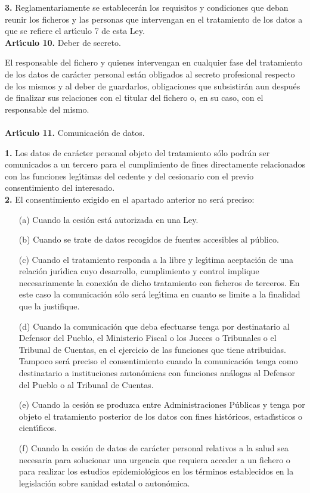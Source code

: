 {\bf 3.} Reglamentariamente se establecer\'an los requisitos y condiciones que 
deban reunir los ficheros y las personas que intervengan en el tratamiento de 
los datos a que se refiere el art\'{\i}culo 7 de esta Ley.
\vspace{0.3cm}\\
{\large {\bf Art\'{\i}culo 10.} Deber de secreto.}

El responsable del fichero y quienes intervengan en cualquier fase del 
tratamiento de los datos de car\'acter personal est\'an obligados al secreto 
profesional respecto de los mismos y al deber de guardarlos, obligaciones que 
subsistir\'an aun despu\'es de finalizar sus relaciones con el titular del 
fichero o, en su caso, con el responsable del mismo.\\
\vspace{0.3cm}\\
{\large {\bf Art\'{\i}culo 11.} Comunicaci\'on de datos.}

{\bf 1.} Los datos de car\'acter personal objeto del tratamiento s\'olo 
podr\'an ser comunicados a un tercero para el cumplimiento de fines 
directamente relacionados con las funciones leg\'{\i}timas del cedente y del 
cesionario con el previo consentimiento del interesado.\\

{\bf 2.} El consentimiento exigido en el apartado anterior no ser\'a preciso:
\begin{itemize}
\item [(a)] Cuando la cesi\'on est\'a autorizada en una Ley.
\item [(b)] Cuando se trate de datos recogidos de fuentes accesibles al 
p\'ublico.
\item [(c)] Cuando el tratamiento responda a la libre y leg\'{\i}tima 
aceptaci\'on de una relaci\'on jur\'{\i}dica cuyo desarrollo, cumplimiento y 
control implique necesariamente la conexi\'on de dicho tratamiento con ficheros 
de terceros. En este caso la comunicaci\'on s\'olo ser\'a leg\'{\i}tima en 
cuanto se limite a la finalidad que la justifique.
\item [(d)] Cuando la comunicaci\'on que deba efectuarse tenga por destinatario 
al Defensor del Pueblo, el Ministerio Fiscal o los Jueces o Tribunales o el 
Tribunal de Cuentas, en el ejercicio de las funciones que tiene atribuidas. 
Tampoco ser\'a preciso el consentimiento cuando la comunicaci\'on tenga como 
destinatario a instituciones auton\'omicas con funciones an\'alogas al Defensor 
del Pueblo o al Tribunal de Cuentas.
\item [(e)] Cuando la cesi\'on se produzca entre Administraciones P\'ublicas y 
tenga por objeto el tratamiento posterior de los datos con fines hist\'oricos,
estad\'{\i}sticos o cient\'{\i}ficos.
\item [(f)] Cuando la cesi\'on de datos de car\'acter personal relativos a la 
salud sea necesaria para solucionar una urgencia que requiera acceder a un 
fichero o para realizar los estudios epidemiol\'ogicos en los t\'erminos 
establecidos en la legislaci\'on sobre sanidad estatal o auton\'omica.
\end{itemize}


